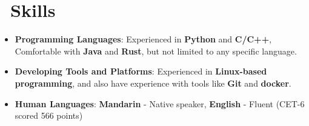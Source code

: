 \documentclass{resume}
\begin{document}




\section{\faCogs\ Skills}
\begin{itemize}[parsep=0.5ex]
  \item \textbf{Programming Languages}: Experienced in \textbf{Python} and \textbf{C/C++}, Comfortable with \textbf{Java} and \textbf{Rust}, but not limited to any specific language.
  \item \textbf{Developing Tools and Platforms}: Experienced in \textbf{Linux-based programming}, and also have experience with tools like \textbf{Git} and \textbf{docker}.
  \item \textbf{Human Languages}: \textbf{Mandarin} - Native speaker, \textbf{English} - Fluent (CET-6 scored 566 points)
\end{itemize}






%
%
\end{document}
